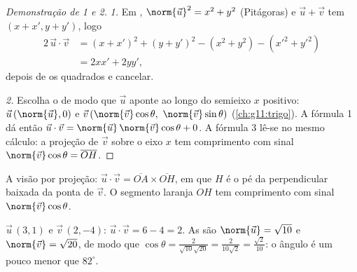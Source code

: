\begin{proof}[Demonstração de 1 e 2]
\emph{1.} Em , $\norm{\vec u}^2 = x^2 + y^2$ (Pitágoras) e
$\vec u + \vec v$ tem  $(x + x', y + y')$, logo
\begin{align*}
2\,\vec u \cdot \vec v
&= (x + x')^2 + (y + y')^2 - (x^2 + y^2) - (x'^2 + y'^2)\\
&= 2xx' + 2yy',
\end{align*}
depois de  os quadrados e cancelar.

\emph{2.} Escolha o  de modo que $\vec u$ aponte ao
longo do semieixo $x$ positivo: $\vec u\,(\norm{\vec u}, 0)$ e
$\vec v\,(\norm{\vec v}\cos\theta,\ \norm{\vec v}\sin\theta)$
(\cref{ch:g11:trigo}). A fórmula 1 dá então
$\vec u \cdot \vec v = \norm{\vec u}\,\norm{\vec v}\cos\theta + 0$. A
fórmula 3 lê-se no mesmo cálculo: a projeção de $\vec v$ sobre o eixo $x$
tem comprimento com sinal
$\norm{\vec v}\cos\theta = \overline{OH}$.
\end{proof}

\begin{omfigure}

{\small A visão por projeção: $\vec u \cdot \vec v = \overline{OA} \times
\overline{OH}$, em que $H$ é o pé da perpendicular baixada da ponta de
$\vec v$. O segmento laranja $OH$ tem comprimento com sinal
$\norm{\vec v}\cos\theta$.}
\end{omfigure}

\begin{example}\label{ex:g11:scal:compute}
$\vec u\,(3, 1)$ e $\vec v\,(2, -4)$: $\vec u \cdot \vec v = 6 - 4 = 2$.
As  são $\norm{\vec u} = \sqrt{10}$ e $\norm{\vec v} = \sqrt{20}$,
de modo que
$\cos\theta = \frac{2}{\sqrt{10}\sqrt{20}} = \frac{2}{10\sqrt2}
= \frac{\sqrt2}{10}$: o ângulo é um pouco menor que $82^\circ$.
\end{example}

